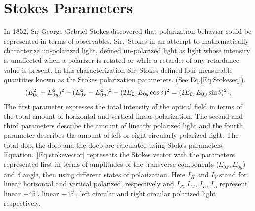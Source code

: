 

\section{Stokes Parameters}\label{sec:chp4-sec3}
In 1852, Sir George Gabriel Stokes discovered that polarization behavior could be represented in terms of observables.
Sir.~Stokes in an attempt to mathematically characterize un-polarized light, defined un-polarized light as light whose intensity is unaffected when a polarizer is rotated or while a retarder of any retardance value is present. 
In this characterization Sir~Stokes defined four measurable quantities known as  the Stokes polarization parameters. (See Eq.\ref{Eq:Stokeseq}).
\begin{equation}\label{Eq:Stokeseq}
\small
	(E_{0x}^{2}+ E_{0y}^{2})^{2} - (E_{0x}^{2}- E_{0y}^{2})^{2}- (2E_{0x}E_{0y}\cos\delta)^{2} =  (2E_{0x}E_{0y}\sin\delta)^{2}~,
\end{equation}
The first parameter expresses the total intensity of the optical field in terms of the total amount of horizontal and vertical linear polarization.
The second and third parameters describe the amount of linearly polarized light and the fourth parameter describes the amount of left or right circularly polarized light.
The total \acf{dop}, the \acf{dolp} and the \acf{docp} are calculated using Stokes parameters.
Equation.~\ref{Eq:stokevector} represents the Stokes vector with the parameters represented first in terms of amplitudes of the transverse components ($E_{0x}, E_{0y}$) and  $\delta$ angle, then using different states of polarization.
Here $I_{H}$ and $I_{V}$ stand for linear horizontal and vertical polarized, respectively and $I_{P}$, $I_{M}$, $I_{L}$, $I_{R}$ represent linear $+45^{\circ}$, linear $-45^{\circ}$, left circular and right circular polarized light, respectively. 

